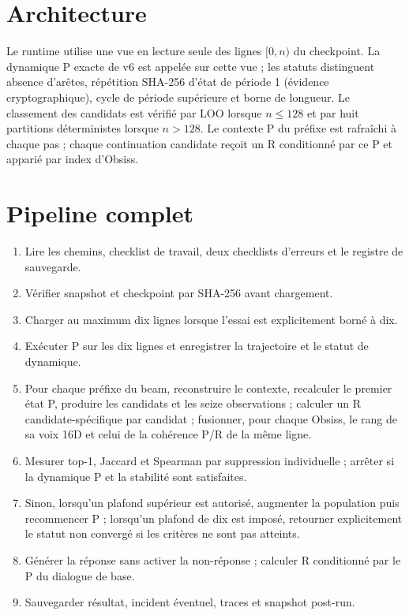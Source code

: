 \documentclass[11pt,a4paper]{report}
\begin{document}
\section{Architecture}
Le runtime utilise une vue en lecture seule des lignes $[0,n)$ du checkpoint. La dynamique P exacte de v6 est appelée sur cette vue ; les statuts distinguent absence d'arêtes, répétition SHA-256 d'état de période 1 (évidence cryptographique), cycle de période supérieure et borne de longueur. Le classement des candidats est vérifié par LOO lorsque $n\leq128$ et par huit partitions déterministes lorsque $n>128$. Le contexte P du préfixe est rafraîchi à chaque pas ; chaque continuation candidate reçoit un R conditionné par ce P et apparié par index d'Obsiss.
\section{Pipeline complet}
\begin{enumerate}[nosep]
\item Lire les chemins, checklist de travail, deux checklists d'erreurs et le registre de sauvegarde.
\item Vérifier snapshot et checkpoint par SHA-256 avant chargement.
\item Charger au maximum dix lignes lorsque l'essai est explicitement borné à dix.
\item Exécuter P sur les dix lignes et enregistrer la trajectoire et le statut de dynamique.
\item Pour chaque préfixe du beam, reconstruire le contexte, recalculer le premier état P, produire les candidats et les seize observations ; calculer un R candidate-spécifique par candidat ; fusionner, pour chaque Obsiss, le rang de sa voix 16D et celui de la cohérence P/R de la même ligne.
\item Mesurer top-1, Jaccard et Spearman par suppression individuelle ; arrêter si la dynamique P et la stabilité sont satisfaites.
\item Sinon, lorsqu'un plafond supérieur est autorisé, augmenter la population puis recommencer P ; lorsqu'un plafond de dix est imposé, retourner explicitement le statut non convergé si les critères ne sont pas atteints.
\item Générer la réponse sans activer la non-réponse ; calculer R conditionné par le P du dialogue de base.
\item Sauvegarder résultat, incident éventuel, traces et snapshot post-run.
\end{enumerate}
\end{document}
